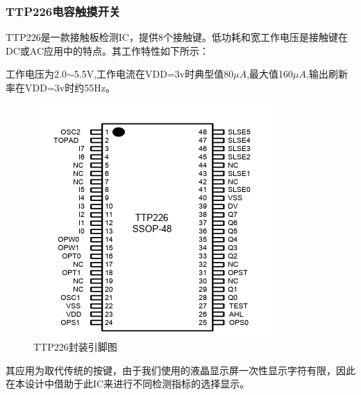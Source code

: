 \documentclass[a4paper, 11pt]{article} %
\begin{document}
\subsubsection{TTP226电容触摸开关}
\par{}TTP226是一款接触板检测IC，提供8个接触键。低功耗和宽工作电压是接触键在DC或AC应用中的特点。其工作特性如下所示：
\par{}工作电压为2.0$\sim$5.5V,工作电流在VDD=3v时典型值80$\mu A$,最大值160$\mu A$,输出刷新率在VDD=3v时约55Hz。
\begin{figure}[H]
  \centering
  \includegraphics[scale = 0.58 ]{1-9.png}
  \caption{TTP226封装引脚图}
  \label{img10} 
\end{figure}
\par{} 其应用为取代传统的按键，由于我们使用的液晶显示屏一次性显示字符有限，因此在本设计中借助于此IC来进行不同检测指标的选择显示。
\end{document}
